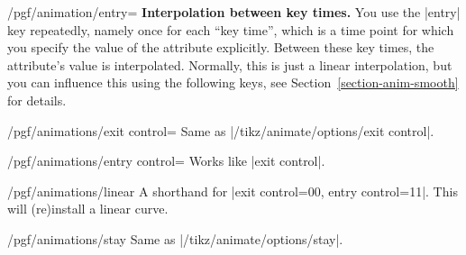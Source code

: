 \begin{key}{/pgf/animation/entry=}
    \medskip
    \textbf{Interpolation between key times.}
    You use the |entry| key repeatedly, namely once for each ``key time'',
    which is a time point for which you specify the value of the attribute
    explicitly. Between these key times, the attribute's value is interpolated.
    Normally, this is just a linear interpolation, but you can influence this
    using the following keys, see Section~\ref{section-anim-smooth} for
    details.

    \begin{key}{/pgf/animations/exit control=}
        Same as |/tikz/animate/options/exit control|.
\begin{codeexample}[
    preamble={\usepgfmodule{animations}},
    animation list={0.333/\frac{1}{3},0.666/\frac{2}{3},1,1.333/1\frac{1}{3},1.666/1\frac{2}{3}},
]
\end{codeexample}
    \end{key}

    \begin{key}{/pgf/animations/entry control=}
        Works like |exit control|.
    \end{key}

    \begin{key}{/pgf/animations/linear}
        A shorthand for |exit control={0}{0}, entry control={1}{1}|. This will
        (re)install a linear curve.
    \end{key}

    \begin{key}{/pgf/animations/stay}
        Same as |/tikz/animate/options/stay|.
\begin{codeexample}[
    preamble={\usepgfmodule{animations}},
    animation list={0.5,1,1.5,2,2.5},
]
\end{codeexample}
    \end{key}


\end{key}
